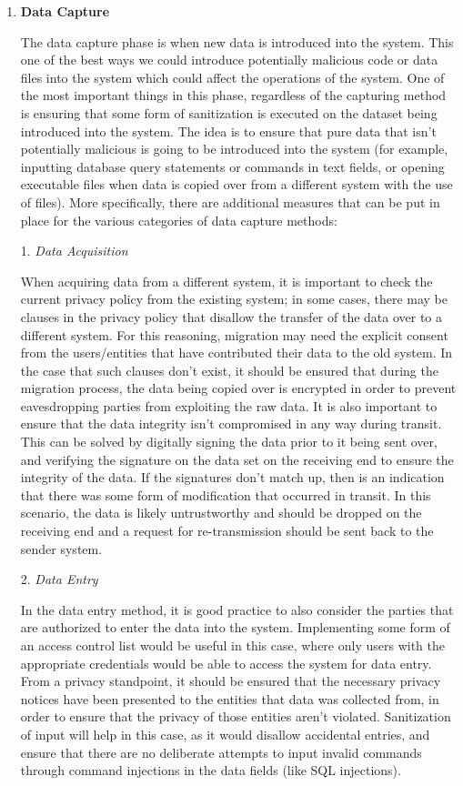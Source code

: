 \documentclass{sigchi}
\begin{document}
\begin{enumerate}
\item \textbf{Data Capture}

The data capture phase is when new data is introduced into the system. This one of the best ways we could introduce potentially malicious code or data files into the system which could affect the operations of the system. One of the most important things in this phase, regardless of the capturing method is ensuring that some form of sanitization is executed on the dataset being introduced into the system. The idea is to ensure that pure data that isn't potentially malicious is going to be introduced into the system (for example, inputting database query statements or commands in text fields, or opening executable files when data is copied over from a different system with the use of files). More specifically, there are additional measures that can be put in place for the various categories of data capture methods:


1. \textit{Data Acquisition}

When acquiring data from a different system, it is important to check the current privacy policy from the existing system; in some cases, there may be clauses in the privacy policy that disallow the transfer of the data over to a different system. For this reasoning, migration may need the explicit consent from the users/entities that have contributed their data to the old system. In the case that such clauses don't exist, it should be ensured that during the migration process, the data being copied over is encrypted in order to prevent eavesdropping parties from exploiting the raw data. It is also important to ensure that the data integrity isn't compromised in any way during transit. This can be solved by digitally signing the data prior to it being sent over, and verifying the signature on the data set on the receiving end to ensure the integrity of the data. If the signatures don't match up, then is an indication that there was some form of modification that occurred in transit. In this scenario, the data is likely untrustworthy and should be dropped on the receiving end and a request for re-transmission should be sent back to the sender system.

2. \textit{Data Entry}

In the data entry method, it is good practice to also consider the parties that are authorized to enter the data into the system. Implementing some form of an access control list would be useful in this case, where only users with the appropriate credentials would be able to access the system for data entry. From a privacy standpoint, it should be ensured that the necessary privacy notices have been presented to the entities that data was collected from, in order to ensure that the privacy of those entities aren't violated. Sanitization of input will help in this case, as it would disallow accidental entries, and ensure that there are no deliberate attempts to input invalid commands through command injections in the data fields (like SQL injections).


\end{enumerate}
\end{document}
